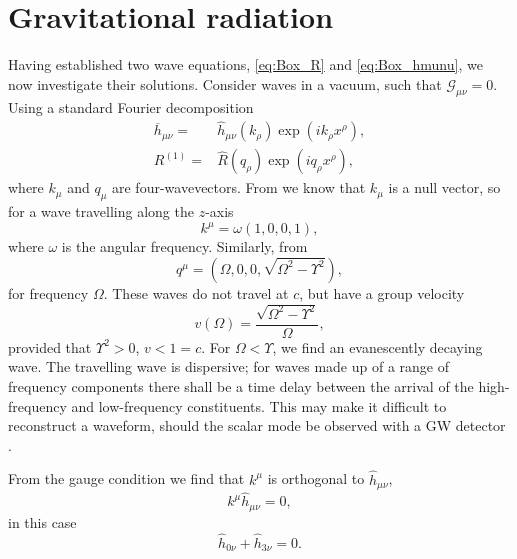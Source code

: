 \section{Gravitational radiation\label{sec:Rad}}

Having established two wave equations, \eqref{eq:Box_R} and \eqref{eq:Box_hmunu}, we now investigate their solutions. Consider waves in a vacuum, such that $\mathcal{G}_{\mu\nu} = 0$. Using a standard Fourier decomposition
\begin{subequations}
\begin{align}
\overline{h}_{\mu\nu} = {} & \widehat{h}_{\mu\nu}(k_\rho) \exp\left(ik_\rho x^\rho\right),\\
R^{(1)} = {} & \widehat{R}(q_\rho) \exp\left(iq_\rho x^\rho\right),
\end{align}
\end{subequations}
where $k_\mu$ and $q_\mu$ are four-wavevectors. From  we know that $k_\mu$ is a null vector, so for a wave travelling along the $z$-axis
\begin{equation}
k^\mu = \omega(1, 0, 0, 1),
\end{equation}
where $\omega$ is the angular frequency. Similarly, from 
\begin{equation}
q^\mu = \left(\Omega, 0, 0, \sqrt{\Omega^2 - \Upsilon^2}\right),
\label{eq:Ricci_q}
\end{equation}
for frequency $\Omega$. These waves do not travel at $c$, but have a group velocity
\begin{equation}
v(\Omega) = \frac{\sqrt{\Omega^2 - \Upsilon^2}}{\Omega},
\end{equation}
provided that $\Upsilon^2 > 0$, $v < 1 = c$. For $\Omega < \Upsilon$, we find an evanescently decaying wave. The travelling wave is dispersive; for waves made up of a range of frequency components there shall be a time delay between the arrival of the high-frequency and low-frequency constituents. This may make it difficult to reconstruct a waveform, should the scalar mode be observed with a GW detector \citep{Corda2009a}.

From the gauge condition  we find that $k^\mu$ is orthogonal to $\widehat{h}_{\mu\nu}$,
\begin{equation}
k^\mu\widehat{h}_{\mu\nu} = 0,
\end{equation}
in this case
\begin{equation}
\widehat{h}_{0\nu} + \widehat{h}_{3\nu} = 0.
\label{eq:Transverse}
\end{equation}

